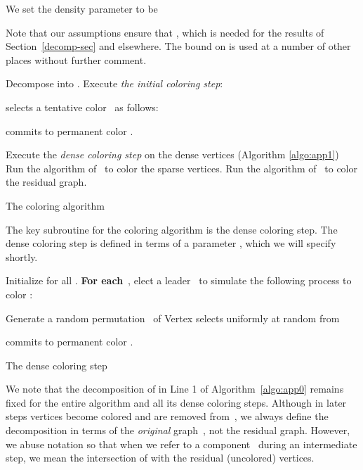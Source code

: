 \documentclass[11pt]{amsart}
\begin{document}
We set the density parameter to be 
 

Note that our assumptions ensure that , which is needed for the results of Section~\ref{decomp-sec} and elsewhere. The bound on  is used at a number of other places without further comment.

\begin{algorithm}[H]
\begin{algorithmic}[1]
\STATE Decompose  into .
\STATE Execute {\it the initial coloring step}:
\begin{ALC@g}
\STATE  selects a tentative color~ as follows:

\STATE  commits to permanent color .
\ENDIF
\ENDFOR
\end{ALC@g}
\FOR{}
\STATE Execute the \emph{dense coloring step} on the dense vertices (Algorithm \ref{algo:app1})
\ENDFOR
\STATE Run the algorithm of~\cite{elk15} to color the sparse vertices.
\STATE Run the algorithm of~\cite{BEPS16} to color the residual graph.
\end{algorithmic} 
\caption{The coloring algorithm}
\label{algo:app0}
\end{algorithm}

The key subroutine for the coloring algorithm is the dense coloring step. The  dense coloring step is defined in terms of a parameter , which we will specify shortly.
\begin{algorithm}[H]
\begin{algorithmic}[1]
\STATE Initialize  for all .
\STATE \textbf{For each}~, elect a leader~ to simulate the following process to color :
\begin{ALC@g}
\STATE Generate a random permutation~ of 
\FOR{}
\STATE Vertex  selects  uniformly at random from 

\ENDFOR
\end{ALC@g}
\STATE  commits to permanent color .
\ENDIF
\ENDFOR
\end{algorithmic}
\caption{The dense coloring step}
\label{algo:app1}
\end{algorithm}

We note that the decomposition of  in Line 1 of Algorithm~\ref{algo:app0} remains fixed for the entire algorithm and all its dense coloring steps. Although in later steps vertices become colored and are removed from~, we always define the decomposition in terms of the \emph{original} graph~, not the residual graph. However, we abuse notation so that when we refer to a component~ during an intermediate step, we mean the intersection of  with the residual (uncolored) vertices. 
\end{document}
